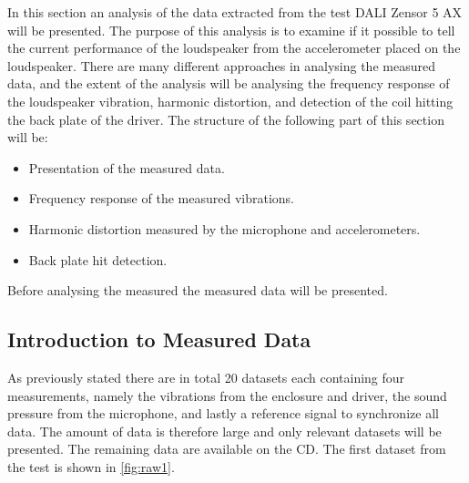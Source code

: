 In this section an analysis of the data extracted from the test DALI Zensor 5 AX will be presented. The purpose of this analysis is to examine if it possible to tell the current performance of the loudspeaker from the accelerometer placed on the loudspeaker. There are many different approaches in analysing the measured data, and the extent of the analysis will be analysing the frequency response of the loudspeaker vibration, harmonic distortion, and detection of the coil hitting the back plate of the driver. The structure of the following part of this section will be:

\begin{itemize}
\item Presentation of the measured data.
\item Frequency response of the measured vibrations.
\item Harmonic distortion measured by the microphone and accelerometers.
\item Back plate hit detection.
\end{itemize}

Before analysing the measured the measured data will be presented.

\subsection{Introduction to Measured Data}

As previously stated there are in total 20 datasets each containing four measurements, namely the vibrations from the enclosure and driver, the sound pressure from the microphone, and lastly a reference signal to synchronize all data. The amount of data is therefore large and only relevant datasets will be presented. The remaining data are available on the CD. The first dataset from the test is shown in \autoref{fig:raw1}.

